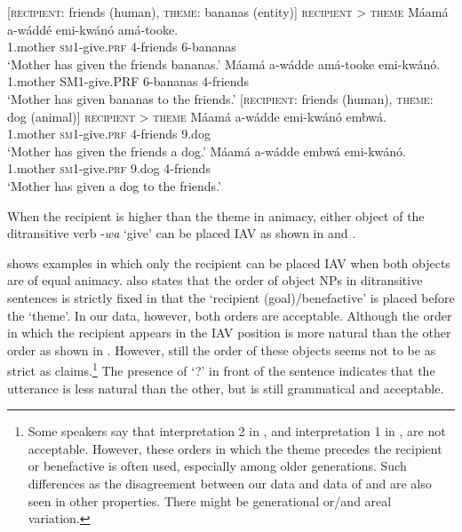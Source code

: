 \documentclass[output=paper,
            colorlinks, citecolor=brown
            ,draftmode
		  ]{langscibook}
\begin{document}
\ea%
    \label{ex:yoneda:9} [\textsc{recipient}: friends (human), \textsc{theme}: bananas (entity)]  \textsc{recipient} > \textsc{theme}
    \ea\label{ex:yoneda:9a}\gll Máamá     a-wáddé       emi-kwánó   amá-tooke.\\
         1.mother    \textsc{sm1}-give.\textsc{prf}  4-friends      6-bananas\\
    \glt ‘Mother has given the friends bananas.’
    \ex\label{ex:yoneda:9b}\gll Máamá     a-wádde       amá-tooke   emi-kwánó.\\
    1.mother    SM1-give.PRF  6-bananas    4-friends\\
    \glt ‘Mother has given bananas to the friends.’
    \z
\ex%
    \label{ex:yoneda:10}
    [\textsc{recipient}: friends (human), \textsc{theme}: dog (animal)]  \textsc{recipient} > \textsc{theme}
    \ea\label{ex:yoneda:10a}\gll Máamá    a-wádde       emi-kwánó   embwá.\\
          1.mother    \textsc{sm1}-give.\textsc{prf}  4-friends      9.dog\\
    \glt ‘Mother has given the friends a dog.’
    \ex\label{ex:yoneda:10b}\gll Máamá     a-wádde         embwá   emi-kwánó.\\
    1.mother    \textsc{sm1}-give.\textsc{prf}  9.dog    4-friends \\
    \glt ‘Mother has given a dog to the friends.’
    \z
\z
       

                 

        

When the recipient is higher than the theme in animacy, either object of the ditransitive verb -\textit{wa} ‘give’ can be placed IAV as shown in  and .

\citet[70]{Ssekiryango2006} shows examples in which only the recipient can be placed IAV when both objects are of equal animacy. \citet[599]{Ranero2019} also states that the order of object NPs in ditransitive sentences is strictly fixed in that the ‘recipient (goal)/benefactive’ is placed before the ‘theme’. In our data, however, both orders are acceptable. Although the order in which the recipient appears in the IAV position is more natural than the other order as shown in . However, still the order of these objects seems not to be as strict as \citet{Ranero2019} claims.\footnote{Some speakers say that interpretation 2 in ,  and interpretation 1 in ,  are not acceptable. However, these orders in which the theme precedes the recipient or benefactive is often used, especially among older generations. Such differences as the disagreement between our data and data of \citet{Ssekiryango2006} and \citet{Ranero2019} are also seen in other properties. There might be generational or/and areal variation.} The presence of ‘?’ in front of the sentence indicates that the utterance is less natural than the other, but is still grammatical and acceptable. 
\end{document}
